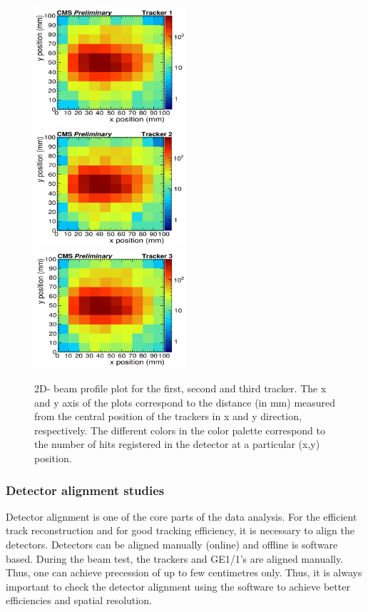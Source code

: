 \begin{figure}[!htbp]
\centering
\includegraphics[width=0.5\textwidth]{figures/GEM/Selection_027.png}%
\includegraphics[width=0.5\textwidth]{figures/GEM/Selection_028.png}\\
\includegraphics[width=0.5\textwidth]{figures/GEM/Selection_029.png}
\caption{2D- beam profile plot for the first, second and third tracker. The x and y axis of the plots correspond to the distance (in mm) measured from the central position of the trackers in x and y direction, respectively. The different colors in the color palette correspond to the number of hits registered in the detector at a particular (x,y) position.}\label{BeamProfile}
\end{figure}

\subsubsection{Detector alignment studies}
Detector alignment is one of the core parts of the data analysis. 
For the efficient track reconstruction and for good tracking efficiency, it is necessary to align the detectors. Detectors can be aligned manually (online) and offline is software based.
During the beam test, the trackers and GE1/1's are aligned manually. Thus, one can achieve precession of up to few centimetres only.
Thus, it is always important to check the detector alignment using the software to achieve better efficiencies and spatial resolution.

